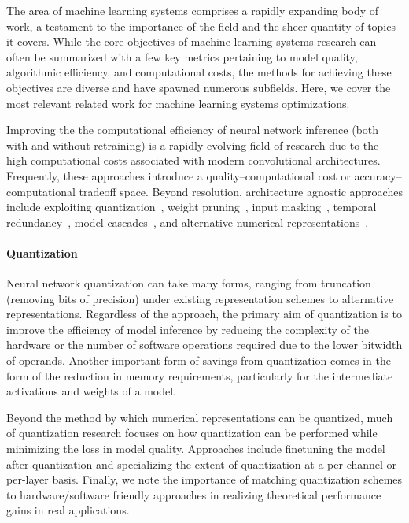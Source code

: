 The area of machine learning systems comprises a rapidly expanding body of work, a testament to the importance of the field and the sheer quantity of topics it covers.
While the core objectives of machine learning systems research can often be summarized with a few key metrics pertaining to model quality, algorithmic efficiency, and computational costs, the methods for achieving these objectives are diverse and have spawned numerous subfields.
Here, we cover the most relevant related work for machine learning systems optimizations.


Improving the the computational efficiency of neural network inference (both with and without retraining) is a rapidly evolving field of research due to the high computational costs associated with modern convolutional architectures.
Frequently, these approaches introduce a quality--computational cost or accuracy--computational tradeoff space.
Beyond resolution, architecture agnostic approaches include exploiting quantization~\cite{rastegari2016xnor, zhou2016dorefa, fromm2020riptide}, weight pruning~\cite{ji2018tetris, frankle2018lottery}, input masking~\cite{yang2018energy}, temporal redundancy~\cite{buckler2018eva2}, model cascades~\cite{shen2017fast}, and alternative numerical representations~\cite{kim2016dynamic, lee2017energy, kalamkar2019study}.

\paragraph{Quantization}
Neural network quantization can take many forms, ranging from truncation (removing bits of precision) under existing representation schemes to alternative representations.
Regardless of the approach, the primary aim of quantization is to improve the efficiency of model inference by reducing the complexity of the hardware or the number of software operations required due to the lower bitwidth of operands.
Another important form of savings from quantization comes in the form of the reduction in memory requirements, particularly for the intermediate activations and weights of a model.

Beyond the method by which numerical representations can be quantized, much of quantization research focuses on how quantization can be performed while minimizing the loss in model quality.
Approaches include finetuning the model after quantization and specializing the extent of quantization at a per-channel or per-layer basis.
Finally, we note the importance of matching quantization schemes to hardware/software friendly approaches in realizing theoretical performance gains in real applications.


